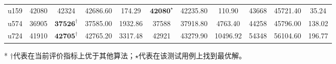 \documentclass[12pt]{ctexart}
\begin{document}
\begin{table}[htbp]
\begin{tabular}{rcccccccccc}
        u159                          & 42080                             & 42324                       & 42686.60                               & 174.29           & $\textbf{42080}^\star$  & 42235.80         & 110.90           & 43668                 & 45721.40         & 35.24            \\
        u574                          & 36905                             & $\textbf{37526}^\dag$       & 37585.00                               & 1932.86          & 37588                   & 37918.80         & 4763.40          & 44258                 & 45796.00         & 138.02           \\
        u724                          & 41910                             & $\textbf{42705}^\dag$       & 42765.20                               & 3317.48          & 42921                   & 43279.90         & 10496.92         & 54348                 & 56104.60         & 196.77           \\
        \bottomrule
    \end{tabular}

    \begin{tablenotes}
        \item [*]   $\dag$代表在当前评价指标上优于其他算法；$\star$代表在该测试用例上找到最优解。
    \end{tablenotes}
\end{table}
\end{document}
